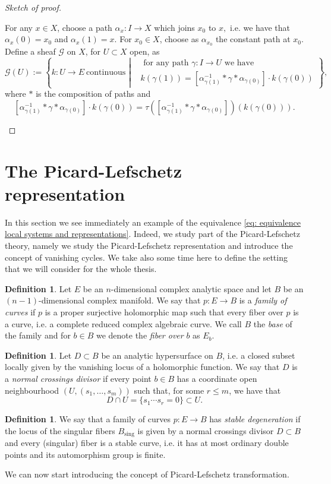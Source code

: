 \documentclass[a4paper,12 pt,titlepage,twoside]{book}
\theoremstyle{plain}
\theoremstyle{theorem}
\theoremstyle{definition}
\newtheorem{defn}[thm]{Definition}
\theoremstyle{remark}
\begin{document}
\begin{proof}[Sketch of proof]
\begin{itemize}
		For any $x \in X$, choose a path $\alpha_x \colon I \rightarrow X$ which joins $x_0$ to $x,$ i.e. we have that $\alpha_x(0)=x_0$ and $\alpha_x(1)=x.$ For $x_0 \in X$, choose as $\alpha_{x_0}$ the constant path at $x_0.$ Define a sheaf $\mathcal{G}$ on $X$, for $U \subset X$ open, as $$\mathcal{G}(U) := \left\{k \colon U \rightarrow E \ \text{continuous } \left| \begin{aligned} &\text{ for any path } \gamma \colon I \rightarrow U \text{ we have } \\ &k(\gamma(1)) = [\alpha_{\gamma(1)}^{-1} * \gamma * \alpha_{\gamma(0)}] \cdot k(\gamma(0))\end{aligned} \right. \right\},$$ where $*$ is the composition of paths and $$[\alpha_{\gamma(1)}^{-1} * \gamma * \alpha_{\gamma(0)}] \cdot k(\gamma(0)) = \tau([\alpha_{\gamma(1)}^{-1} * \gamma * \alpha_{\gamma(0)}])(k(\gamma(0))).$$ 
	\end{itemize}
\end{proof}
\section{The Picard-Lefschetz representation}\label{sec: picard-lefschetz transformations}
In this section we see immediately an example of the equivalence \eqref{eq: equivalence local systems and representations}. Indeed, we study part of the Picard-Lefschetz theory, namely we study the Picard-Lefschetz representation and introduce the concept of vanishing cycles. We take also some time here to define the setting that we will consider for the whole thesis.
\begin{defn}
	Let $E$ be an $n$-dimensional complex analytic space and let $B$ be an $(n-1)$-dimensional complex manifold. We say that $p\colon E \rightarrow B$ is a \emph{family of curves} if $p$ is a proper surjective holomorphic map such that every fiber over $p$ is a curve, i.e. a complete reduced complex algebraic curve. We call $B$ the \emph{base} of the family and for $b \in B$ we denote the \emph{fiber over} $b$ as $E_b.$
\end{defn}
\begin{defn}
	Let $D \subset B$ be an analytic hypersurface on $B$, i.e. a closed subset locally given by the vanishing locus of a holomorphic function. We say that $D$ is a \emph{normal crossings divisor} if every point $b \in B$ has a coordinate open neighbourhood $(U,(s_1, \dots, s_m))$ such that, for some $r \le m$, we have that $$D\cap U =\{s_1 \cdots s_r =0\}\subset U.$$
\end{defn}
\begin{defn}
	We say that a family of curves $p\colon E \rightarrow B$ has \emph{stable degeneration} if the locus of the singular fibers $B_{\text{sing}}$ is given by a normal crossings divisor $D \subset B$ and every (singular) fiber is a stable curve, i.e. it has at most ordinary double points and its automorphism group is finite.
\end{defn}
We can now start introducing the concept of Picard-Lefschetz transformation.
\end{document}
